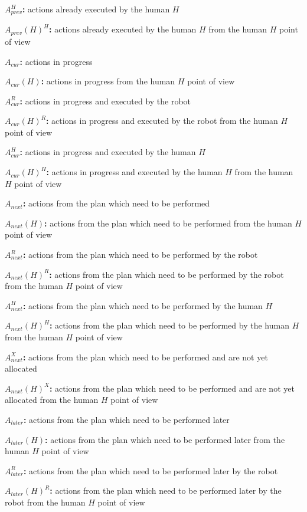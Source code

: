 \textbf{$A_{prev}^H$:} actions already executed by the human $H$

\textbf{$A_{prev}(H)^H$:} actions already executed by the human $H$ from the human $H$ point of view

\textbf{$A_{cur}$:} actions in progress

\textbf{$A_{cur}(H)$:} actions in progress from the human $H$ point of view

\textbf{$A_{cur}^R$:} actions in progress and executed by the robot

\textbf{$A_{cur}(H)^R$:} actions in progress and executed by the robot from the human $H$ point of view

\textbf{$A_{cur}^H$:} actions in progress and executed by the human $H$

\textbf{$A_{cur}(H)^H$:} actions in progress and executed by the human $H$ from the human $H$ point of view

\textbf{$A_{next}$:} actions from the plan which need to be performed

\textbf{$A_{next}(H)$:} actions from the plan which need to be performed from the human $H$ point of view

\textbf{$A_{next}^R$:} actions from the plan which need to be performed by the robot

\textbf{$A_{next}(H)^R$:} actions from the plan which need to be performed by the robot from the human $H$ point of view

\textbf{$A_{next}^H$:} actions from the plan which need to be performed by the human $H$

\textbf{$A_{next}(H)^H$:} actions from the plan which need to be performed by the human $H$ from the human $H$ point of view

\textbf{$A_{next}^X$:} actions from the plan which need to be performed and are not yet allocated

\textbf{$A_{next}(H)^X$:} actions from the plan which need to be performed and are not yet allocated from the human $H$ point of view

\textbf{$A_{later}$:} actions from the plan which need to be performed later

\textbf{$A_{later}(H)$:} actions from the plan which need to be performed later from the human $H$ point of view

\textbf{$A_{later}^R$:} actions from the plan which need to be performed later by the robot

\textbf{$A_{later}(H)^R$:} actions from the plan which need to be performed later by the robot from the human $H$ point of view

